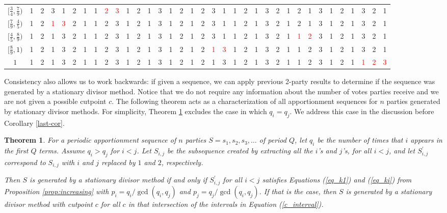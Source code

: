 \documentclass[pdflatex,sn-mathphys-num]{sn-jnl}
\theoremstyle{thmstyleone}%
\newtheorem{theorem}{Theorem}%
\theoremstyle{thmstyletwo}%
\theoremstyle{thmstylethree}%
\begin{document}
\begin{table}
\begin{tabular}{c|*{34}c}
$[\frac{3}{4}, \frac{7}{9} )$ &1&2&3&1&2&1&1&\textcolor{red}{2}&\textcolor{red}{3}&1&2&1&3&1&2&1&2&3&1&1&2&1&3&2&1&2&1&3&1&2&1&3&2&1  \\ 
$[\frac{7}{9}, \frac{4}{5} )$ &1&2&\textcolor{red}{1}&\textcolor{red}{3}&2&1&1&2&3&1&2&1&3&1&2&1&2&3&1&1&2&1&3&2&1&2&1&3&1&2&1&3&2&1  \\ 
$[\frac{4}{5}, \frac{8}{9} )$ &1&2&1&3&2&1&1&2&3&1&2&1&3&1&2&1&2&3&1&1&2&1&3&2&1&\textcolor{red}{1}&\textcolor{red}{2}&3&1&2&1&3&2&1  \\ 
$[\frac{8}{9}, 1 )$ &1&2&1&3&2&1&1&2&3&1&2&1&3&1&2&1&2&\textcolor{red}{1}&\textcolor{red}{3}&1&2&1&3&2&1&1&2&3&1&2&1&3&2&1  \\ 
$1$ &1&2&1&3&2&1&1&2&3&1&2&1&3&1&2&1&2&1&3&1&2&1&3&2&1&1&2&3&1&2&1&\textcolor{red}{1}&\textcolor{red}{2}&\textcolor{red}{3}  \\ 
 \end{tabular}
 \end{table}
 
Consistency also allows us to work backwards: if given a sequence, we can apply previous 2-party results to determine if the sequence was generated by a stationary divisor method. Notice that we do not require any information about the number of votes parties receive and we are not given a possible cutpoint $c$.  The following theorem acts as a characterization of all apportionment sequences for $n$ parties generated by stationary divisor methods.  For simplicity, Theorem \ref{working-backwards} excludes the case in which $q_i = q_j$.  We address this case in the discussion before Corollary \ref{last-cor}.

\begin{theorem} \label{working-backwards}
For a periodic apportionment sequence of $n$ parties $S=s_1, s_2, s_3, \ldots$ of period $Q$, let $q_i$ be the number of times that $i$ appears in the first $Q$ terms. Assume $q_i > q_j$ for $i < j$. Let  $S_{i,j}$ be the subsequence created by extracting all the $i$'s and $j$'s, for all  $i<j$, and let $S^\prime_{i, j}$ correspond to $S_{i,j}$ with $i$ and $j$ replaced by $1$ and $2$, respectively.  

Then $S$ is generated by a stationary divisor method if and only if $S_{i,j}^\prime$ for all $i < j$ satisfies Equations (\ref{eq_k1}) and (\ref{eq_ki}) from Proposition \ref{prop:increasing} with $p_i = q_i / \gcd(q_i,q_j)$ and $p_j = q_j / \gcd(q_i,q_j)$.  If that is the case, then $S$ is generated by a stationary divisor method with cutpoint $c$ for all $c$ in that intersection of the intervals in Equation (\ref{c_interval}).  
\end{theorem}
\end{document}
